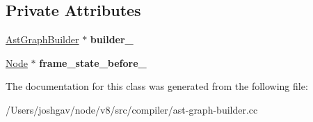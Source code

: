 \subsection*{Private Attributes}
\begin{DoxyCompactItemize}
\item 
\hyperlink{classv8_1_1internal_1_1compiler_1_1_ast_graph_builder}{Ast\+Graph\+Builder} $\ast$ {\bfseries builder\+\_\+}\hypertarget{classv8_1_1internal_1_1compiler_1_1_ast_graph_builder_1_1_frame_state_before_and_after_aaa9ab8fc921604413b9b770067f77b9f}{}\label{classv8_1_1internal_1_1compiler_1_1_ast_graph_builder_1_1_frame_state_before_and_after_aaa9ab8fc921604413b9b770067f77b9f}

\item 
\hyperlink{classv8_1_1internal_1_1compiler_1_1_node}{Node} $\ast$ {\bfseries frame\+\_\+state\+\_\+before\+\_\+}\hypertarget{classv8_1_1internal_1_1compiler_1_1_ast_graph_builder_1_1_frame_state_before_and_after_a31fdf5203e7e438b63f84b2953f08dff}{}\label{classv8_1_1internal_1_1compiler_1_1_ast_graph_builder_1_1_frame_state_before_and_after_a31fdf5203e7e438b63f84b2953f08dff}

\end{DoxyCompactItemize}


The documentation for this class was generated from the following file\+:\begin{DoxyCompactItemize}
\item 
/\+Users/joshgav/node/v8/src/compiler/ast-\/graph-\/builder.\+cc\end{DoxyCompactItemize}

